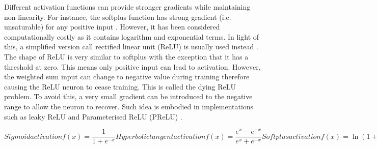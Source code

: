 \documentclass[11pt]{article} %
\theoremstyle{plain}
\theoremstyle{definition}
\begin{document}
\begin{appendices}
	Different activation functions can provide stronger gradients while maintaining non-linearity. For instance, the softplus function has strong gradient (i.e. unsaturable) for any positive input \cite{françois}. However, it has been considered computationally costly as it contains logarithm and exponential terms. In light of this, a simplified version call rectified linear unit (ReLU) is usually used instead \cite{hahnloser}. The shape of ReLU is very similar to softplus with the exception that it has a threshold at zero. This means only positive input can lead to activation. However, the weighted sum input can change to negative value during training therefore causing the ReLU neuron to cease training. This is called the dying ReLU problem. To avoid this, a very small gradient can be introduced to the negative range to allow the neuron to recover. Such idea is embodied in implementations such as leaky ReLU \cite{maas} and Parameterised ReLU (PReLU) \cite{he}.
	
	\begin{subequations}
		Sigmoid activation
		\begin{equation}
		\label{sigmoid}
		f(x)= \frac{1}{1+e^{-x}}
		\end{equation}
		
		Hyperbolic tangent activation
		\begin{equation}
		\label{tanh}
		f(x)= \frac{e^x-e^{-x}}{e^x+e^{-x}}
		\end{equation}
		
		Softplus activation
		\begin{equation}
		\label{softplus}
		f(x)= \ln(1+e^x)
		\end{equation}
		
		Rectified linear unit (ReLU)
		\begin{equation}
		\label{relu}
		f(x)= \max(0,x)
		\end{equation}
		
		Leaky ReLU
		\begin{equation}
		\label{leaky}
		f(x)= \begin{cases}
		0.001x\\
		x
		\end{cases}
		\end{equation}
		
		Parametrised ReLU (PReLU)
		\begin{equation}
		\label{prelu}
		f(x)= \begin{cases}
		ax\\
		x
		\end{cases}
		\end{equation}
		

\end{subequations}
\end{appendices}
\end{document}
